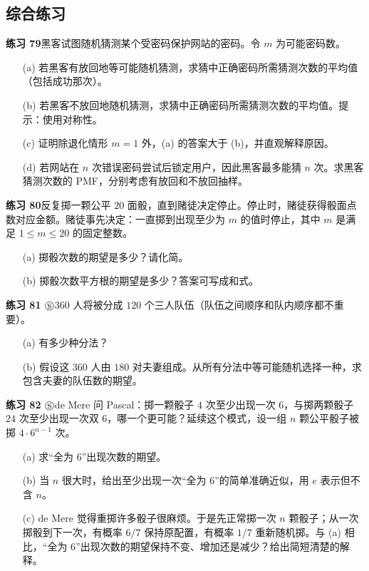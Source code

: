 \documentclass[UTF8, 12pt, fontset=fandol, oneside]{ctexart}
\begin{document}
\subsection*{综合练习}

\noindent\textbf{练习 79}\quad 黑客试图随机猜测某个受密码保护网站的密码。令 $m$ 为可能密码数。
\begin{enumerate}
  \item[(a)] 若黑客有放回地等可能随机猜测，求猜中正确密码所需猜测次数的平均值（包括成功那次）。
  \item[(b)] 若黑客不放回地随机猜测，求猜中正确密码所需猜测次数的平均值。提示：使用对称性。
  \item[(c)] 证明除退化情形 $m=1$ 外，(a) 的答案大于 (b)，并直观解释原因。
  \item[(d)] 若网站在 $n$ 次错误密码尝试后锁定用户，因此黑客最多能猜 $n$ 次。求黑客猜测次数的 PMF，分别考虑有放回和不放回抽样。
\end{enumerate}

\noindent\textbf{练习 80}\quad 反复掷一颗公平 $20$ 面骰，直到赌徒决定停止。停止时，赌徒获得骰面点数对应金额。赌徒事先决定：一直掷到出现至少为 $m$ 的值时停止，其中 $m$ 是满足 $1\le m\le20$ 的固定整数。
\begin{enumerate}
  \item[(a)] 掷骰次数的期望是多少？请化简。
  \item[(b)] 掷骰次数平方根的期望是多少？答案可写成和式。
\end{enumerate}

\noindent\textbf{练习 81 $\circledS$}\quad $360$ 人将被分成 $120$ 个三人队伍（队伍之间顺序和队内顺序都不重要）。
\begin{enumerate}
  \item[(a)] 有多少种分法？
  \item[(b)] 假设这 $360$ 人由 $180$ 对夫妻组成。从所有分法中等可能随机选择一种，求包含夫妻的队伍数的期望。
\end{enumerate}

\noindent\textbf{练习 82 $\circledS$}\quad de Mere 问 Pascal：掷一颗骰子 $4$ 次至少出现一次 $6$，与掷两颗骰子 $24$ 次至少出现一次双 $6$，哪一个更可能？延续这个模式，设一组 $n$ 颗公平骰子被掷 $4\cdot 6^{n-1}$ 次。
\begin{enumerate}
  \item[(a)] 求“全为 $6$”出现次数的期望。
  \item[(b)] 当 $n$ 很大时，给出至少出现一次“全为 $6$”的简单准确近似，用 $e$ 表示但不含 $n$。
  \item[(c)] de Mere 觉得重掷许多骰子很麻烦。于是先正常掷一次 $n$ 颗骰子；从一次掷骰到下一次，有概率 $6/7$ 保持原配置，有概率 $1/7$ 重新随机掷。与 (a) 相比，“全为 $6$”出现次数的期望保持不变、增加还是减少？给出简短清楚的解释。
\end{enumerate}
\end{document}
